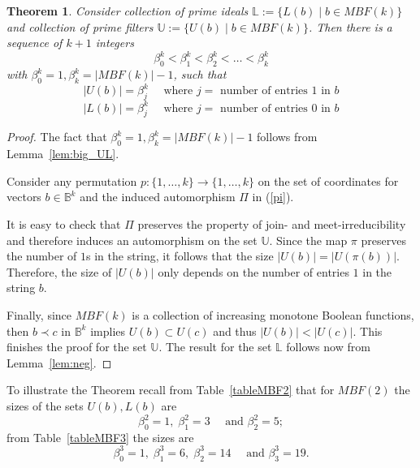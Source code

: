 \documentclass[10pt,letterpaper]{article}
\newcommand{\bbB}{\mathbb{B}}
\newcommand{\bL}{\mathbb{L}}
\newcommand{\bU}{\mathbb{U}}
\newtheorem{thm}{Theorem}[section]
\begin{document}
\begin{thm}
    Consider collection of prime ideals $\bL:=\{L(b)\;|\; b \in MBF(k)\} $ and collection of prime filters
    $\bU:=\{U(b)\;|\; b \in MBF(k)\}$. 
    Then there is a sequence of $k+1$ integers
    \[ \beta_0^k<\beta^k_1<\beta^k_2< \ldots <\beta^k_k \]
    with $\beta_0^k=1, \beta^k_k= |MBF(k)|-1$, 
    such that 
    \[ |U(b)| = \beta^k_j \quad \mbox{ where } j = \mbox{ number of entries $1$ in } b \]
    \[ |L(b)| = \beta^k_j \quad \mbox{ where } j = \mbox{ number of entries $0$ in } b \]
\end{thm}
\begin{proof}
The fact that $\beta_0^k=1, \beta^k_k= |MBF(k)|-1$ follows from Lemma~\ref{lem:big_UL}.

Consider any permutation $p:\{1, \ldots, k\} \to \{1, \ldots, k\}$ on the set of coordinates for vectors $b \in \bbB^k$ and the induced automorphism $\Pi$ in (\ref{pi}).

It is easy to check that $\Pi$ preserves the property of join- and meet-irreducibility and therefore induces an automorphism on the set $\bU$. Since the map $\pi$ preserves the number of $1$s in the string, it follows that the size $|U(b)| = |U(\pi(b))|$. Therefore, the size of $|U(b)|$ only depends on the number of entries $1$ in the string $b$. 

Finally, since $MBF(k)$ is a collection of increasing monotone Boolean functions, then $b \prec c$ in $\bbB^k$ implies 
$U(b) \subset U(c)$ and thus $|U(b)| < |U(c)| $.
This finishes the proof for the set $\bU$.
The result for the set $\bL$ follows now from Lemma~\ref{lem:neg}.
\end{proof}

To illustrate the Theorem recall from Table~\ref{tableMBF2} that for $MBF(2)$ the sizes of the sets $U(b), L(b) $ are 
\[ \beta_0^2 = 1,\; \beta_1^2= 3 \quad \mbox{ and } \beta_2^2 = 5;\]
from Table~\ref{tableMBF3} the sizes are 
\[ \beta_0^3 = 1, \;\beta_1^3= 6,\; \beta_2^3=14 \quad \mbox{ and } \beta_3^3 = 19. \]

\vskip0.3in

\end{document}
